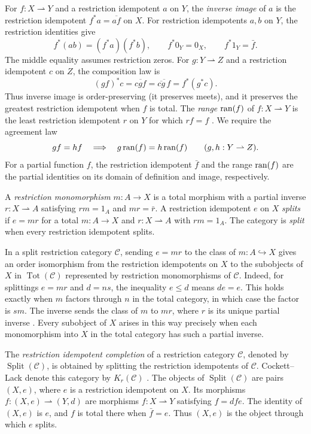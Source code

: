 For $f:X\rightharpoonup Y$ and a restriction idempotent $a$ on $Y$,
the \emph{inverse image} of $a$ is the restriction idempotent
$f^*a=\overline{af}$ on $X$. For restriction idempotents $a,b$ on $Y$,
the restriction identities give
\[
 f^*(ab)=(f^*a)(f^*b),\qquad
 f^*0_Y=0_X,\qquad f^*1_Y=\bar f.
\]
The middle equality assumes restriction zeros. For $g:Y\rightharpoonup Z$
and a restriction idempotent $c$ on $Z$, the composition law is
\[
 (gf)^*c=\overline{cgf}=\overline{\overline{cg}\,f}=f^*(g^*c).
\]
Thus inverse image is order-preserving (it preserves meets), and it
preserves the greatest restriction idempotent when $f$ is total.
The \emph{range} $\operatorname{ran}(f)$ of $f:X\rightharpoonup Y$ is the least
restriction idempotent $r$ on $Y$ for which $rf=f$
\cite[Section~6]{Heller}. We require the agreement law
\[
 gf=hf\quad\Longrightarrow\quad
 g\operatorname{ran}(f)=h\operatorname{ran}(f)
 \qquad(g,h:Y\rightharpoonup Z).
\]
For a partial function $f$, the restriction idempotent
$\bar f$ and the range $\operatorname{ran}(f)$ are the partial identities on its
domain of definition and image, respectively.

A \emph{restriction monomorphism} $m:A\to X$ is a total morphism
with a partial inverse $r:X\rightharpoonup A$ satisfying
$rm=1_A$ and $mr=\bar r$.
A restriction idempotent $e$ on $X$ \emph{splits} if
$e=mr$ for a total $m:A\to X$ and $r:X\rightharpoonup A$
with $rm=1_A$. The category is \emph{split} when every restriction
idempotent splits.

In a split restriction category $\mathcal C$, sending $e=mr$ to the
class of $m:A\hookrightarrow X$ gives an order isomorphism from the
restriction idempotents on $X$ to the subobjects of $X$ in
$\operatorname{Tot}(\mathcal C)$ represented by restriction monomorphisms
of $\mathcal C$.
Indeed, for splittings $e=mr$ and $d=ns$, the inequality $e\le d$
means $de=e$. This holds exactly when $m$ factors through $n$ in the
total category, in which case the factor is $sm$. The inverse sends the class
of $m$ to $mr$, where $r$ is its unique partial inverse
\cite[Section~2.3.3, Lemma~2.25]{CockettLack}.
Every subobject of $X$ arises in this way precisely when each
monomorphism into $X$ in the total category has such a partial inverse.

The \emph{restriction idempotent completion} of a restriction category
$\mathcal C$, denoted by $\operatorname{Split}(\mathcal C)$, is obtained
by splitting the restriction idempotents of $\mathcal C$.
Cockett--Lack denote this category by $K_r(\mathcal C)$
\cite[Section~2.3.3]{CockettLack}.
The objects of $\operatorname{Split}(\mathcal C)$ are pairs $(X,e)$, where $e$ is a
restriction idempotent on $X$. Its morphisms
$f:(X,e)\rightharpoonup(Y,d)$ are morphisms
$f:X\rightharpoonup Y$ satisfying $f=dfe$.
The identity of $(X,e)$ is $e$, and $f$ is total there when
$\bar f=e$. Thus $(X,e)$ is the object through which $e$ splits.


